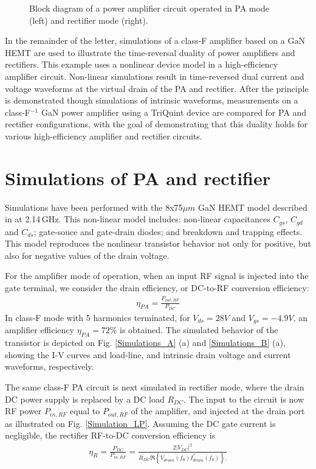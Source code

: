\documentclass[twocolumn]{el-author}
\begin{document}
\begin{figure} [h]
\caption{Block diagram of a power amplifier circuit operated in PA mode (left) and rectifier mode (right). 
\source{}}\label{Fig-ELett}
\end{figure}


In the remainder of the letter, simulations of a class-F amplifier based on a GaN HEMT are used to illustrate the time-reversal duality of power amplifiers and rectifiers. This example uses a nonlinear device model in a high-efficiency amplifier circuit. Non-linear simulations result in time-reversed dual current and voltage waveforms at the virtual drain of the PA and rectifier. After the principle is demonstrated though simulations of intrinsic waveforms, measurements on a class-F$^{-1}$ GaN power amplifier using a TriQuint device are compared for PA and rectifier configurations, with the goal of demonstrating that this duality holds for various high-efficiency amplifier and rectifier circuits. 
%
%
%
\section{Simulations of PA and rectifier}
Simulations have been performed with the 8x75$\mu m$ GaN HEMT model described in \cite{2} at 2.14\,GHz. This non-linear model includes: non-linear capacitances $C_{gs}$, $C_{gd}$ and $C_{ds}$; gate-souce and gate-drain diodes; and breakdown and trapping effects. This model reproduces the nonlinear transistor behavior not only for positive, but also for negative values of the drain voltage.


For the amplifier mode of operation, when an input RF signal is injected into the gate terminal, we consider the drain efficiency, or DC-to-RF conversion efficiency: 
\begin{align} \eta_{PA}=\frac{P_{out,RF}}{P_{DC}}\end{align}
In class-F mode with 5 harmonics terminated, for $V_{ds}=28V$ and $V_{gs}=-4.9V$, an amplifier efficiency $\eta_{PA}=72\%$ is obtained. The simulated behavior of the transistor is depicted on Fig. \ref{Simulations_A} (a) and \ref{Simulations_B} (a), showing the I-V curves and load-line, and intrinsic drain voltage and current waveforms, respectively.

The same class-F PA circuit is next simulated in rectifier mode, where the drain DC power supply is replaced by a DC load $R_{DC}$. The input to the circuit is now RF power $P_{in,RF}$ equal to $P_{out,RF}$ of the amplifier, and injected at the drain port as illustrated on Fig. \ref{Simulation_LP}. Assuming the DC gate current is negligible, the rectifier RF-to-DC conversion efficiency is 
\begin{align}
  \eta_{R}=\frac{P_{DC}}{P_{in,RF}}
  =\frac{2{\left|V_{DC}\right|}^2}{R_{DC}\Re{\left\{V_{drain}(f_0)I_{drain}^*(f_0)\right\}}.}
\end{align}
\end{document}
